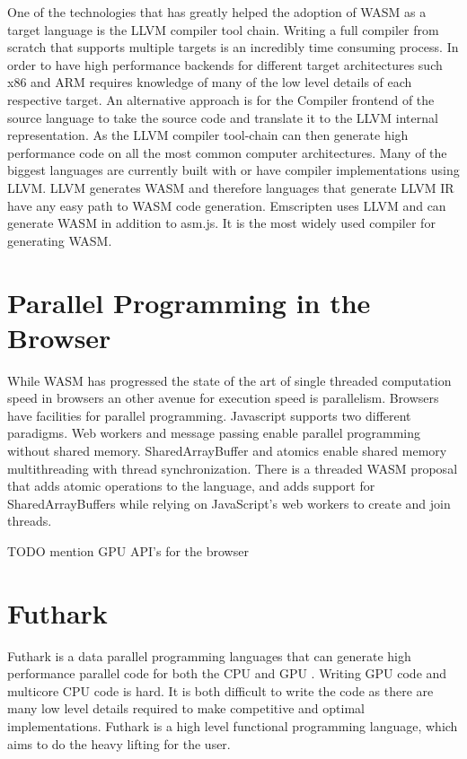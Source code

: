 \documentclass[11pt]{book}
\begin{document}
One of the technologies that has greatly helped the adoption of WASM as a target language is the LLVM compiler tool chain. Writing a full compiler from scratch that supports multiple targets is an incredibly time consuming process. In order to have high performance backends for different target architectures such x86 and ARM requires knowledge of many of the low level details of each respective target. An alternative approach is for the Compiler frontend of the source language to take the source code and translate it to the LLVM internal representation. As the LLVM compiler tool-chain can then generate high performance code on all the most common computer architectures. Many of the biggest languages are currently built with or have compiler implementations using LLVM.
LLVM generates WASM and therefore languages that generate LLVM IR have any easy path to WASM code generation. 
Emscripten uses LLVM and can generate WASM in addition to asm.js. It is the most widely used compiler for generating WASM.

\section{Parallel Programming in the Browser}
While WASM has progressed the state of the art of single threaded computation speed in browsers an other avenue for execution speed is parallelism. Browsers have facilities for parallel programming. Javascript supports two different paradigms. Web  workers  and  message  passing  enable  parallel  programming  without  shared  memory. SharedArrayBuffer and atomics enable shared memory multithreading with thread synchronization.  There is a threaded WASM proposal that adds atomic operations to the language, and adds support for SharedArrayBuffers while relying on JavaScript’s web workers to create and join threads. 

TODO mention GPU API's for the browser

\section{Futhark}

Futhark \cite{futhark_phd} is a data parallel programming languages that can generate high performance parallel code for both the CPU and GPU .  Writing GPU code and multicore CPU code is hard. It is both difficult to write the code as there are many low level details required to make competitive and optimal implementations. Futhark is a high level functional programming language, which aims to do the heavy lifting for the user.
\end{document}
